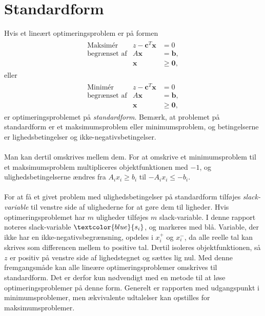 \section{Standardform}
\label{sec:standard}
% 
Hvis et lineært optimeringsproblem er på formen
%
\begin{align*}
\begin{array}{lrl}
\text{Maksimér}		&z - \textbf{c}^T\textbf{x}	&	=0		\\
\text{begrænset af}	&A\textbf{x}	&=\mathbf{b},	\\
					&\mathbf{x}				&\geq \mathbf{0},
\end{array}
\end{align*}
eller
\begin{align*}
\begin{array}{lrl}
\text{Minimér}		&z - \textbf{c}^T\textbf{x}	&	=0		\\
\text{begrænset af}	&A\textbf{x}	&=\mathbf{b},	\\
					&\mathbf{x}				&\geq \mathbf{0},
\end{array}
\end{align*}
%
er optimeringsproblemet på \textit{standardform}.
Bemærk, at problemet på standardform er et maksimumsproblem eller minimumsproblem, og betingelserne er lighedsbetingelser og ikke-negativsbetingelser.
\\\\
%
Man kan dertil omskrives mellem dem.
For at omskrive et minimumsproblem til et maksimumsproblem multipliceres objektfunktionen med $-1$, og ulighedsbetingelserne ændres fra $A_ix_i \geq b_i$ til $-A_ix_i \leq -b_i$.
\\\\
%
For at få et givet problem med ulighedsbetingelser på standardform tilføjes \textit{slack-variable} til venstre side af ulighederne for at gøre dem til ligheder. 
Hvis optimeringsproblemet har $m$ uligheder tilføjes $m$ slack-variable.
I denne rapport noteres slack-variable $\textcolor{blue}{s_i}$, og markeres med blå.
Variable, der ikke har en ikke-negativsbegrænsning, opdeles i $x_i^+$ og $x_i^-$, da alle reelle tal kan skrives som differencen mellem to positive tal.
Dertil isoleres objektfunktionen, så $z$ er positiv på venstre side af lighedstegnet og sættes lig nul.
Med denne fremgangsmåde kan alle lineære optimeringsproblemer omskrives til standardform.
Det er derfor kun nødvendigt med en metode til at løse optimeringsproblemer på denne form.
Generelt er rapporten med udgangspunkt i minimumsproblemer, men ækvivalente udtalelser kan opstilles for maksimumsproblemer.
%

